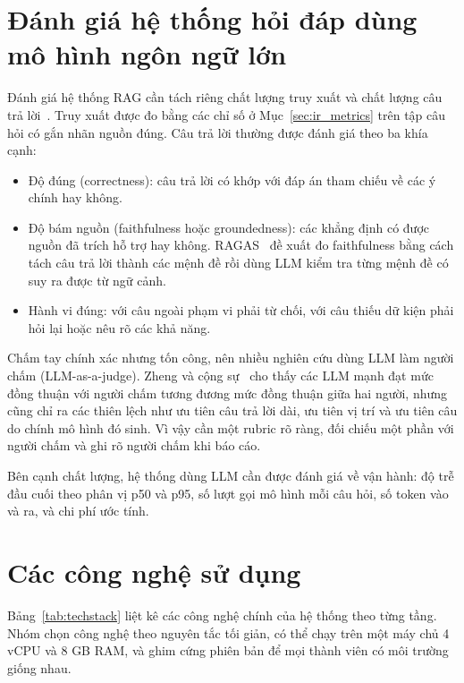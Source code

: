 \section{Đánh giá hệ thống hỏi đáp dùng mô hình ngôn ngữ lớn}
\label{sec:eval_theory}

Đánh giá hệ thống RAG cần tách riêng chất lượng truy xuất và chất lượng câu trả lời~\cite{gao2023ragsurvey,es2024ragas}. Truy xuất được đo bằng các chỉ số ở Mục~\ref{sec:ir_metrics} trên tập câu hỏi có gắn nhãn nguồn đúng. Câu trả lời thường được đánh giá theo ba khía cạnh:
\begin{itemize}
    \item Độ đúng (correctness): câu trả lời có khớp với đáp án tham chiếu về các ý chính hay không.
    \item Độ bám nguồn (faithfulness hoặc groundedness): các khẳng định có được nguồn đã trích hỗ trợ hay không. RAGAS~\cite{es2024ragas} đề xuất đo faithfulness bằng cách tách câu trả lời thành các mệnh đề rồi dùng LLM kiểm tra từng mệnh đề có suy ra được từ ngữ cảnh.
    \item Hành vi đúng: với câu ngoài phạm vi phải từ chối, với câu thiếu dữ kiện phải hỏi lại hoặc nêu rõ các khả năng.
\end{itemize}

Chấm tay chính xác nhưng tốn công, nên nhiều nghiên cứu dùng LLM làm người chấm (LLM-as-a-judge). Zheng và cộng sự~\cite{zheng2023judge} cho thấy các LLM mạnh đạt mức đồng thuận với người chấm tương đương mức đồng thuận giữa hai người, nhưng cũng chỉ ra các thiên lệch như ưu tiên câu trả lời dài, ưu tiên vị trí và ưu tiên câu do chính mô hình đó sinh. Vì vậy cần một rubric rõ ràng, đối chiếu một phần với người chấm và ghi rõ người chấm khi báo cáo.

Bên cạnh chất lượng, hệ thống dùng LLM cần được đánh giá về vận hành: độ trễ đầu cuối theo phân vị p50 và p95, số lượt gọi mô hình mỗi câu hỏi, số token vào và ra, và chi phí ước tính.

\section{Các công nghệ sử dụng}
\label{sec:tech}

Bảng~\ref{tab:techstack} liệt kê các công nghệ chính của hệ thống theo từng tầng. Nhóm chọn công nghệ theo nguyên tắc tối giản, có thể chạy trên một máy chủ 4 vCPU và 8 GB RAM, và ghim cứng phiên bản để mọi thành viên có môi trường giống nhau.

